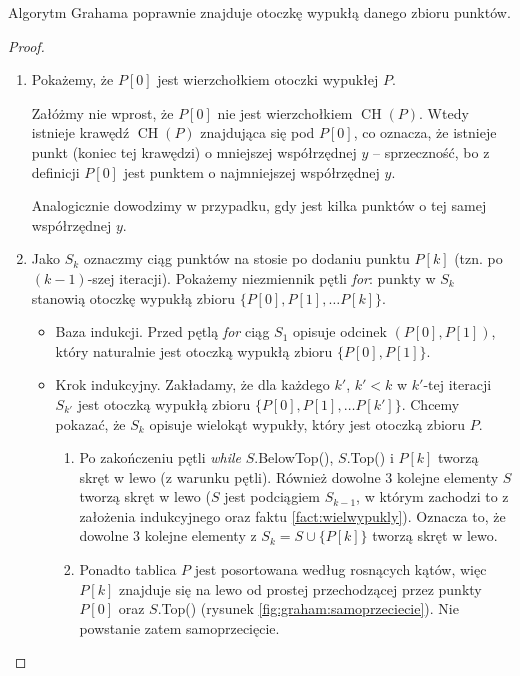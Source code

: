 \begin{theorem}
	Algorytm Grahama poprawnie znajduje otoczkę wypukłą danego zbioru punktów.
	\begin{proof}
		\phantom{a}
		\begin{enumerate}
			\item Pokażemy, że $P[0]$ jest wierzchołkiem otoczki wypukłej $P$. 
			
			Załóżmy nie wprost, że $P[0]$ nie jest wierzchołkiem $\operatorname{CH}(P)$. Wtedy istnieje krawędź $\operatorname{CH}(P)$ znajdująca się pod $P[0]$, co oznacza, że istnieje punkt (koniec tej krawędzi) o mniejszej współrzędnej $y$ -- sprzeczność, bo z definicji $P[0]$ jest punktem o najmniejszej współrzędnej $y$.
			
			Analogicznie dowodzimy w przypadku, gdy jest kilka punktów o tej samej współrzędnej $y$.
			
			\item Jako $S_k$ oznaczmy ciąg punktów na stosie po dodaniu punktu $P[k]$ (tzn. po ${(k-1)}$-szej iteracji). Pokażemy niezmiennik pętli \textit{for}: punkty w $S_{k}$ stanowią otoczkę wypukłą zbioru $\{P[0], P[1], \dots P[k]\}$.
			
			\begin{itemize}
				\item Baza indukcji. Przed pętlą \textit{for} ciąg $S_1$ opisuje odcinek $(P[0], P[1])$, który naturalnie jest otoczką wypukłą zbioru  $\{P[0], P[1]\}$.
				
				\item Krok indukcyjny. Zakładamy, że dla każdego $k'$, $k'<k$ w $k'$-tej iteracji $S_{k'}$ jest otoczką wypukłą zbioru $\{P[0], P[1], \dots P[k']\}$. 
				Chcemy pokazać, że $S_k$ opisuje wielokąt wypukły, który jest otoczką zbioru $P$.
				
				\begin{enumerate}				
					\item Po zakończeniu pętli \textit{while} $S$.BelowTop(), $S$.Top() i $P[k]$ tworzą skręt w lewo (z warunku pętli). Również dowolne 3 kolejne elementy $S$ tworzą skręt w lewo ($S$ jest podciągiem $S_{k-1}$, w którym zachodzi to z założenia indukcyjnego oraz faktu \ref{fact:wielwypukly}). Oznacza to, że dowolne 3 kolejne elementy z $S_k = S \cup \{P[k]\}$ tworzą skręt w lewo. 
					
					\item Ponadto tablica $P$ jest posortowana według rosnących kątów, więc $P[k]$ znajduje się na lewo od prostej przechodzącej przez punkty $P[0]$ oraz $S$.Top() (rysunek \ref{fig:graham:samoprzeciecie}). Nie powstanie zatem samoprzecięcie.
					

\end{enumerate}
\end{itemize}
\end{enumerate}
\end{proof}
\end{theorem}
